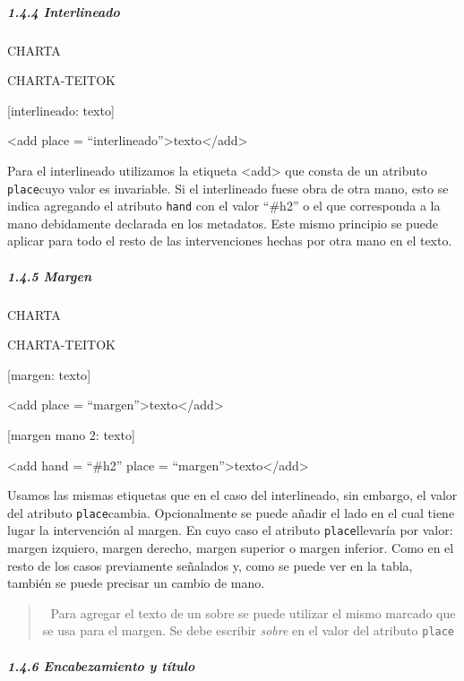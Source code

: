 \documentclass[
]{book}
\begin{document}
\hypertarget{interlineado}{%
\subparagraph*{1.4.4 Interlineado}\label{interlineado}}

CHARTA

CHARTA-TEITOK

{[}interlineado: texto{]}

{\textless add} {place} {=} {``interlineado''}{\textgreater{}}texto{\textless/add\textgreater{}}

Para el interlineado utilizamos la etiqueta { \textless add\textgreater{}} que consta de un atributo \texttt{place}cuyo valor es invariable. Si el interlineado fuese obra de otra mano, esto se indica agregando el atributo \texttt{hand} con el valor ``\#h2'' o el que corresponda a la mano debidamente declarada en los metadatos. Este mismo principio se puede aplicar para todo el resto de las intervenciones hechas por otra mano en el texto.

\hypertarget{margen}{%
\subparagraph*{1.4.5 Margen}\label{margen}}

CHARTA

CHARTA-TEITOK

{[}margen: texto{]}

{\textless add} {place} {=} {``margen''}{\textgreater{}}texto{\textless/add\textgreater{}}

{[}margen mano 2: texto{]}

{\textless add} {hand} {=} {``\#h2''} {place} {=} {``margen''}{\textgreater{}}texto{\textless/add\textgreater{}}

Usamos las mismas etiquetas que en el caso del interlineado, sin embargo, el valor del atributo \texttt{place}cambia. Opcionalmente se puede añadir el lado en el cual tiene lugar la intervención al margen. En cuyo caso el atributo \texttt{place}llevaría por valor: margen izquiero, margen derecho, margen superior o margen inferior. Como en el resto de los casos previamente señalados y, como se puede ver en la tabla, también se puede precisar un cambio de mano.

\begin{quote}
📝 Para agregar el texto de un sobre se puede utilizar el mismo marcado que se usa para el margen. Se debe escribir \emph{sobre} en el valor del atributo \texttt{place}
\end{quote}

\hypertarget{encabezamiento-y-tuxedtulo}{%
\subparagraph*{1.4.6 Encabezamiento y título}\label{encabezamiento-y-tuxedtulo}}
\end{document}
